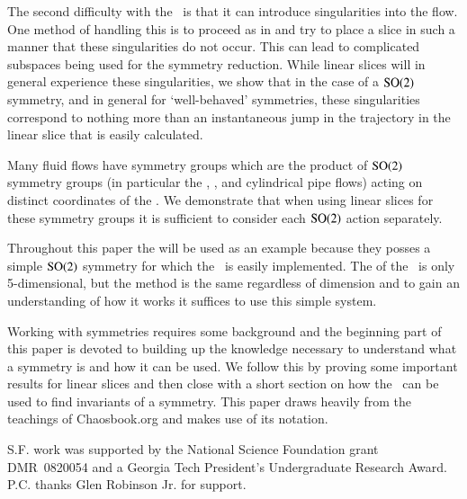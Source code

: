 The second difficulty with the \mslices\ is that it can introduce singularities into the flow. One method of handling this is to proceed as in  and try to place a slice in such a manner that these singularities do not occur. This can lead to complicated subspaces being used for the symmetry reduction. While linear slices will in general experience these singularities, we show that in the case of a $\textrm{SO}(2)$ symmetry, and in general for `well-behaved' symmetries, these singularities correspond to nothing more than an instantaneous jump in the trajectory in the linear slice that is easily calculated.

Many fluid flows have symmetry groups which are the product of $\textrm{SO}(2)$ symmetry groups (in particular the \KS, {\pCf}, and cylindrical pipe flows) acting on distinct coordinates of the {\statesp}. We demonstrate that when using linear slices for these symmetry groups it is sufficient to consider each $\textrm{SO}(2)$ action separately.

Throughout this paper the \cLe{} will be used as an example because they posses a simple $\textrm{SO}(2)$ symmetry for which the \mslices\ is easily implemented. The {\statesp} of the \cLe\ is only 5-dimensional, but the method is the same regardless of dimension and to gain an understanding of how it works it suffices to use this simple system.

Working with symmetries requires some background and the beginning part of this paper is devoted to building up the knowledge necessary to understand what a symmetry is and how it can be used. We follow this by proving some important results for linear slices and then close with a short section on how the \mslices\ can be used to find invariants of a symmetry. This paper draws heavily from the teachings of Chaosbook.org and makes use of its notation.

\bigskip
{}
S.F. work was supported by the National Science Foundation
grant DMR~0820054 and a Georgia Tech President's Undergraduate
Research Award.
P.C. thanks Glen Robinson Jr. for support. 	



